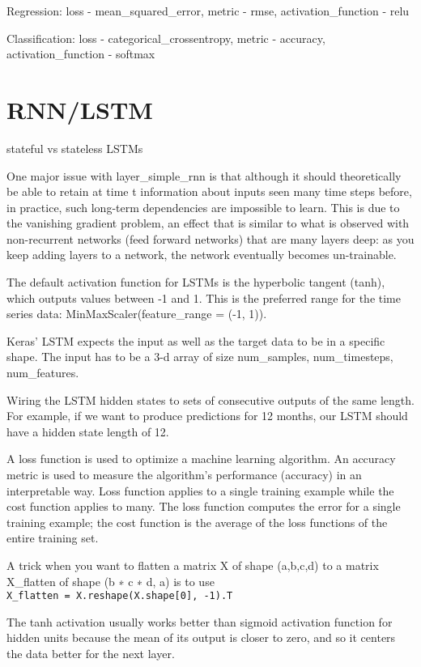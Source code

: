 \documentclass[]{book}
\begin{document}
Regression: loss - mean\_squared\_error, metric - rmse, activation\_function - relu

Classification: loss - categorical\_crossentropy, metric - accuracy, activation\_function - softmax

\hypertarget{rnnlstm}{%
\section{RNN/LSTM}\label{rnnlstm}}

stateful vs stateless LSTMs

One major issue with layer\_simple\_rnn is that although it should theoretically be able to retain at time t information about inputs seen many time steps before, in practice, such long-term dependencies are impossible to learn. This is due to the vanishing gradient problem, an effect that is similar to what is observed with non-recurrent networks (feed forward networks) that are many layers deep: as you keep adding layers to a network, the network eventually becomes un-trainable.

The default activation function for LSTMs is the hyperbolic tangent (tanh), which outputs values between -1 and 1. This is the preferred range for the time series data: MinMaxScaler(feature\_range = (-1, 1)).

Keras' LSTM expects the input as well as the target data to be in a specific shape. The input has to be a 3-d array of size num\_samples, num\_timesteps, num\_features.

Wiring the LSTM hidden states to sets of consecutive outputs of the same length. For example, if we want to produce predictions for 12 months, our LSTM should have a hidden state length of 12.

A loss function is used to optimize a machine learning algorithm. An accuracy metric is used to measure the algorithm's performance (accuracy) in an interpretable way. Loss function applies to a single training example while the cost function applies to many. The loss function computes the error for a single training example; the cost function is the average of the loss functions of the entire training set.

A trick when you want to flatten a matrix X of shape (a,b,c,d) to a matrix X\_flatten of shape (b ∗ c ∗ d, a) is to use \texttt{X\_flatten\ =\ X.reshape(X.shape{[}0{]},\ -1).T}

The tanh activation usually works better than sigmoid activation function for hidden units because the mean of its output is closer to zero, and so it centers the data better for the next layer.
\end{document}
